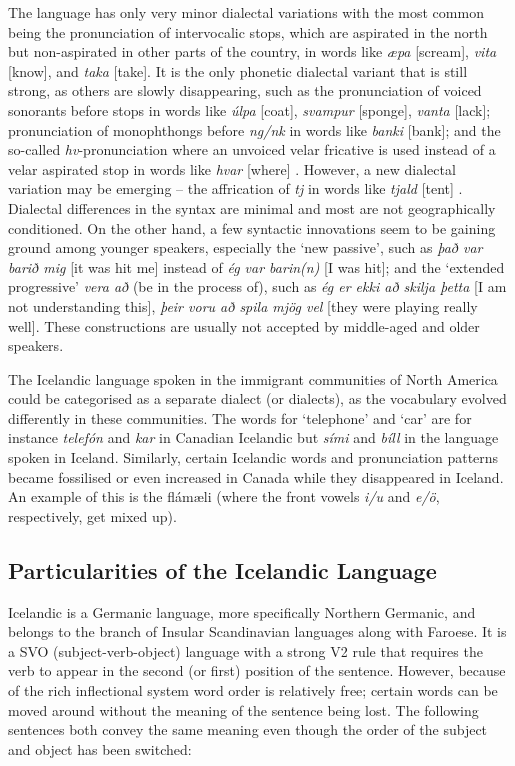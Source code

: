 \begin{multicols}{2}
The language has only very minor dialectal variations with the most common being the pronunciation of intervocalic stops, which are aspirated in the north but non-aspirated in other parts of the country, in words like \textit{æpa} {[}scream{]}, \textit{vita} {[}know{]}, and \textit{taka} {[}take{]}. It is the only phonetic dialectal variant that is still strong, as others are slowly disappearing, such as the pronunciation of voiced sonorants before stops in words like \textit{úlpa} {[}coat{]}, \textit{svamp\-ur} {[}sponge{]}, \textit{vanta} {[}lack{]}; pronunciation of monophthongs before \textit{ng/nk} in words like \textit{banki} {[}bank{]}; and the so-called \textit{hv}-pronunciation where an unvoiced velar fricative is used instead of a velar aspirated stop in words like \textit{hvar} {[}where{]} \cite{mal1}.  However, a new dialectal variation may be emerging -- the affrication of \textit{tj} in words like \textit{tjald} {[}tent{]} \cite{tvi1}. 
Dialectal differences in the syntax are minimal and most are not geographically conditioned. On the other hand, a few syntactic innovations seem to be gaining ground among younger speakers, especially the ‘new passive’, such as \textit{það var barið mig} {[}it was hit me{]} instead of \textit{ég var barin(n)} {[}I was hit{]}; and the ‘extended progressive’ \textit{vera að} (be in the process of), such as \textit{ég er ekki að skilja þetta} {[}I am not understanding this{]}, \textit{þeir voru að spila mjög vel} {[}they were playing really well{]}. These constructions are usually not accepted by middle-aged and older speakers.

The Icelandic language spoken in the immigrant communities of North America could be categorised as a separate dialect (or dialects), as the vocabulary evolved differently in these communities. The words for ‘telephone’ and ‘car’ are for instance \textit{telefón} and \textit{kar} in Canadian Icelandic but \textit{sími} and \textit{bíll} in the language spoken in Iceland. Similarly, certain Icelandic words and pronunciation patterns became fossilised or even increased in Canada while they disappeared in Iceland. An example of this is the flámæli (where the front vowels \textit{i/u} and \textit{e/ö}, respectively, get mixed up).

\subsection{Particularities of the Icelandic Language}

Icelandic is a Germanic language, more specifically Northern Germanic, and belongs to the branch of Insular Scandinavian languages along with Faroese. It is a SVO (subject-verb-object) language with a strong V2 rule that requires the verb to appear in the second (or first) position of the sentence. However, because of the rich inflectional system word order is relatively free; certain words can be moved around without the meaning of the sentence being lost. The following sentences both convey the same meaning even though the order of the subject and object has been switched:


\end{multicols}
